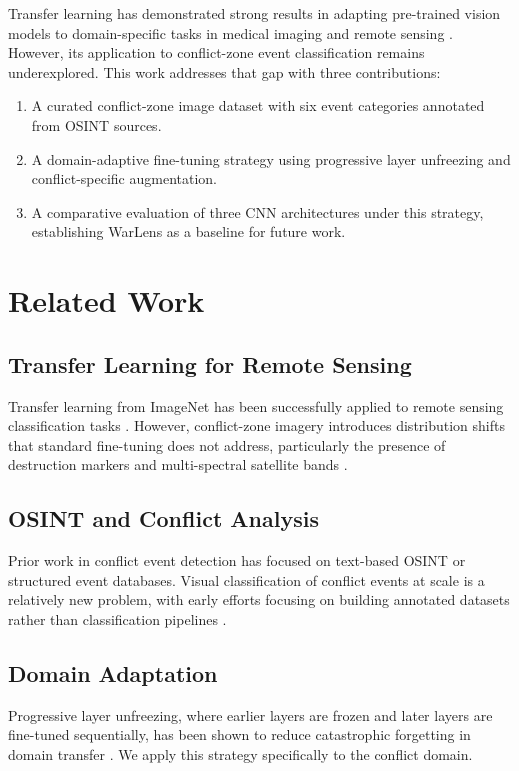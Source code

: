 \documentclass[conference]{IEEEtran}
\begin{document}
Transfer learning has demonstrated strong results in adapting pre-trained vision models to domain-specific tasks in medical imaging \cite{rajpurkar2017chexnet} and remote sensing \cite{chen2016deep}. However, its application to conflict-zone event classification remains underexplored. This work addresses that gap with three contributions:

\begin{enumerate}
\item A curated conflict-zone image dataset with six event categories annotated from OSINT sources.
\item A domain-adaptive fine-tuning strategy using progressive layer unfreezing and conflict-specific augmentation.
\item A comparative evaluation of three CNN architectures under this strategy, establishing WarLens as a baseline for future work.
\end{enumerate}

\section{Related Work}

\subsection{Transfer Learning for Remote Sensing}
Transfer learning from ImageNet has been successfully applied to remote sensing classification tasks \cite{marmanis2016deep}. However, conflict-zone imagery introduces distribution shifts that standard fine-tuning does not address, particularly the presence of destruction markers and multi-spectral satellite bands \cite{gupta2019xbd}.

\subsection{OSINT and Conflict Analysis}
Prior work in conflict event detection has focused on text-based OSINT \cite{leetaru2013gdelt} or structured event databases. Visual classification of conflict events at scale is a relatively new problem, with early efforts focusing on building annotated datasets rather than classification pipelines \cite{baumgartner2019open}.

\subsection{Domain Adaptation}
Progressive layer unfreezing, where earlier layers are frozen and later layers are fine-tuned sequentially, has been shown to reduce catastrophic forgetting in domain transfer \cite{howard2018universal}. We apply this strategy specifically to the conflict domain.
\end{document}
